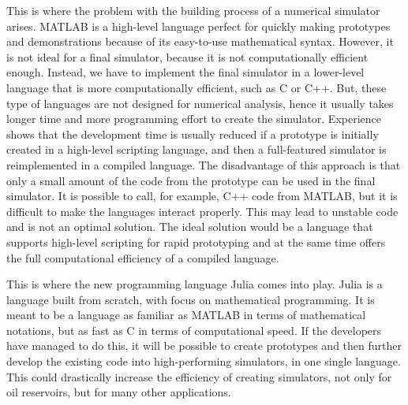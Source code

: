This is where the problem with the building process of a numerical simulator arises. MATLAB is a high-level language perfect for quickly making prototypes and demonstrations because of its easy-to-use mathematical syntax. However, it is not ideal for a final simulator, because it is not computationally efficient enough. Instead, we have to implement the final simulator in a lower-level language that is more computationally efficient, such as C or C++. But, these type of languages are not designed for numerical analysis, hence it usually takes longer time and more programming effort to create the simulator. Experience shows that the development time is usually reduced if a prototype is initially created in a high-level scripting language, and then a full-featured simulator is reimplemented in a compiled language. The disadvantage of this approach is that only a small amount of the code from the prototype can be used in the final simulator. It is possible to call, for example, C++ code from MATLAB, but it is difficult to make the languages interact properly. This may lead to unstable code and is not an optimal solution. The ideal solution would be a language that supports high-level scripting for rapid prototyping and at the same time offers the full computational efficiency of a compiled language.

This is where the new programming language Julia comes into play. Julia is a language built from scratch, with focus on mathematical programming. It is meant to be a language as familiar as MATLAB in terms of mathematical notations, but as fast as C in terms of computational speed. If the developers have managed to do this, it will be possible to create prototypes and then further develop the existing code into high-performing simulators, in one single language. This could drastically increase the efficiency of creating simulators, not only for oil reservoirs, but for many other applications. 

